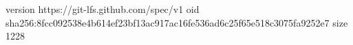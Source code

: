 version https://git-lfs.github.com/spec/v1
oid sha256:8fcc092538e4b614ef23bf13ac917ac16fe536ad6c25f65e518c3075fa9252e7
size 1228
